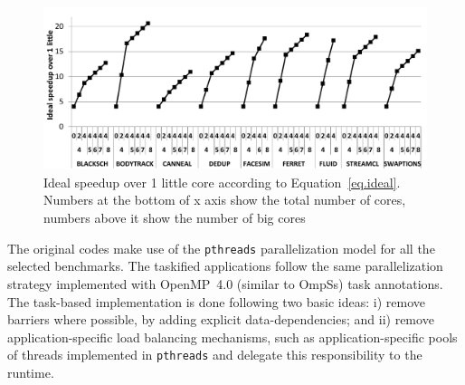 %

\begin{figure}[t]%
	\centering
	\includegraphics[width=1\columnwidth]{figures/ideal_speedup.pdf}
	\caption{Ideal speedup over 1 little core according to Equation~\ref{eq.ideal}. Numbers at the bottom of x axis show the total number of cores, numbers above it show the number of big cores}
	\label{fig:ideal}%
\end{figure}

The original codes make use of the \texttt{pthreads} parallelization model for all the selected benchmarks. The taskified applications follow the same parallelization strategy implemented with OpenMP~4.0 (similar to OmpSs)  task annotations.
The task-based implementation is done following two basic ideas: i) remove barriers where possible, by adding explicit data-dependencies; and ii) remove application-specific load balancing mechanisms, such as application-specific pools of threads implemented in \texttt{pthreads} and delegate this responsibility to the runtime.


